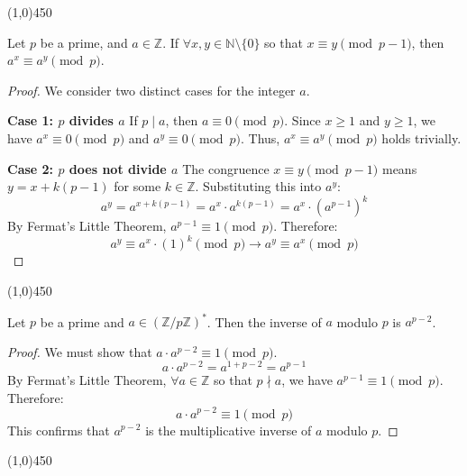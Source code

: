 \begin{center}
    \vspace{10pt}
    \line(1,0){450}
    \vspace{25pt}
\end{center}

\begin{corollary}
Let $p$ be a prime, and $a \in \mathbb{Z}$. If $\forall x, y \in \mathbb{N} \setminus \{0\}$ so that $x \equiv y \pmod{p-1}$, then $a^x \equiv a^y \pmod{p}$.
\end{corollary}
\begin{proof}
We consider two distinct cases for the integer $a$.

\textbf{Case 1: $p$ divides $a$}
If $p \mid a$, then $a \equiv 0 \pmod{p}$. Since $x \ge 1$ and $y \ge 1$, we have $a^x \equiv 0 \pmod{p}$ and $a^y \equiv 0 \pmod{p}$.
Thus, $a^x \equiv a^y \pmod{p}$ holds trivially.

\textbf{Case 2: $p$ does not divide $a$}
The congruence $x \equiv y \pmod{p-1}$ means $y = x + k(p-1)$ for some $k \in \mathbb{Z}$.
Substituting this into $a^y$:
$$
a^y = a^{x + k(p-1)} = a^x \cdot a^{k(p-1)} = a^x \cdot (a^{p-1})^k
$$
By Fermat's Little Theorem, $a^{p-1} \equiv 1 \pmod{p}$. Therefore:
$$
a^y \equiv a^x \cdot (1)^k \pmod{p} \rightarrow a^y \equiv a^x \pmod{p}
$$
\end{proof}

\begin{center}
    \vspace{10pt}
    \line(1,0){450}
    \vspace{25pt}
\end{center}

\begin{corollary}
Let $p$ be a prime and $a \in (\mathbb{Z}/p\mathbb{Z})^*$. Then the inverse of $a$ modulo $p$ is $a^{p-2}$.
\end{corollary}
\begin{proof}
We must show that $a \cdot a^{p-2} \equiv 1 \pmod{p}$.
$$
a \cdot a^{p-2} = a^{1 + p-2} = a^{p-1}
$$
By Fermat's Little Theorem, $\forall a \in \mathbb{Z}$ so that $p \nmid a$, we have $a^{p-1} \equiv 1 \pmod{p}$.
Therefore:
$$
a \cdot a^{p-2} \equiv 1 \pmod{p}
$$
This confirms that $a^{p-2}$ is the multiplicative inverse of $a$ modulo $p$.
\end{proof}

\begin{center}
    \vspace{10pt}
    \line(1,0){450}
    \vspace{25pt}
\end{center}

